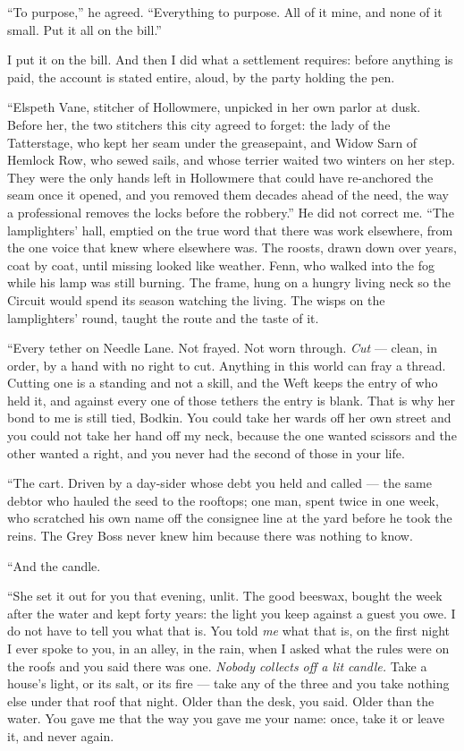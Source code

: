 ``To purpose,'' he agreed. ``Everything to purpose. All of it mine, and none of it small. Put it all on the bill.''

I put it on the bill. And then I did what a settlement requires: before anything is paid, the account is stated entire, aloud, by the party holding the pen.

``Elspeth Vane, stitcher of Hollowmere, unpicked in her own parlor at dusk. Before her, the two stitchers this city agreed to forget: the lady of the Tatterstage, who kept her seam under the greasepaint, and Widow Sarn of Hemlock Row, who sewed sails, and whose terrier waited two winters on her step. They were the only hands left in Hollowmere that could have re-anchored the seam once it opened, and you removed them decades ahead of the need, the way a professional removes the locks before the robbery.'' He did not correct me. ``The lamplighters' hall, emptied on the true word that there was work elsewhere, from the one voice that knew where elsewhere was. The roosts, drawn down over years, coat by coat, until missing looked like weather. Fenn, who walked into the fog while his lamp was still burning. The frame, hung on a hungry living neck so the Circuit would spend its season watching the living. The wisps on the lamplighters' round, taught the route and the taste of it.

``Every tether on Needle Lane. Not frayed. Not worn through. \emph{Cut} --- clean, in order, by a hand with no right to cut. Anything in this world can fray a thread. Cutting one is a standing and not a skill, and the Weft keeps the entry of who held it, and against every one of those tethers the entry is blank. That is why her bond to me is still tied, Bodkin. You could take her wards off her own street and you could not take her hand off my neck, because the one wanted scissors and the other wanted a right, and you never had the second of those in your life.

``The cart. Driven by a day-sider whose debt you held and called --- the same debtor who hauled the seed to the rooftops; one man, spent twice in one week, who scratched his own name off the consignee line at the yard before he took the reins. The Grey Boss never knew him because there was nothing to know.

``And the candle.

``She set it out for you that evening, unlit. The good beeswax, bought the week after the water and kept forty years: the light you keep against a guest you owe. I do not have to tell you what that is. You told \emph{me} what that is, on the first night I ever spoke to you, in an alley, in the rain, when I asked what the rules were on the roofs and you said there was one. \emph{Nobody collects off a lit candle.} Take a house's light, or its salt, or its fire --- take any of the three and you take nothing else under that roof that night. Older than the desk, you said. Older than the water. You gave me that the way you gave me your name: once, take it or leave it, and never again.

